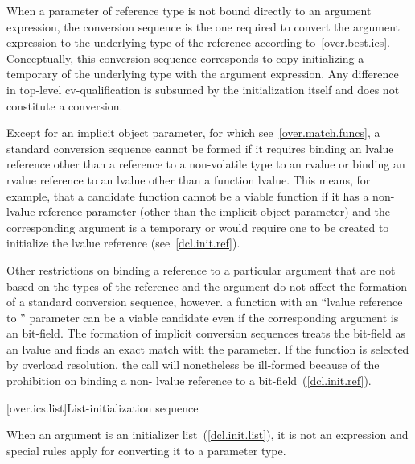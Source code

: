 \pnum
When a parameter of reference type is not bound directly to an argument
expression, the conversion sequence is the one required to convert the argument
expression to the underlying type of the reference according to~\ref{over.best.ics}.
Conceptually, this conversion sequence corresponds to copy-initializing a
temporary of the underlying type with the argument expression.
Any difference
in top-level cv-qualification is subsumed by the initialization itself and
does not constitute a conversion.

\pnum
Except for an implicit object parameter, for which see~\ref{over.match.funcs}, a
standard conversion sequence cannot be formed if it requires
binding an lvalue reference
other than a reference to a non-volatile  type
to an rvalue
or binding an rvalue reference to an lvalue other than a function lvalue.
\enternote
This means, for example, that a candidate function cannot be a viable
function if it has a non- lvalue reference parameter (other than
the implicit object parameter) and the corresponding argument is
a temporary or would require one to be created to initialize the lvalue
reference (see~\ref{dcl.init.ref}).
\exitnote

\pnum
Other restrictions on binding a reference to a particular argument
that are not based on the types of the reference and the argument
do not affect the formation of a standard conversion
sequence, however.
\enterexample
a function with an ``lvalue reference to '' parameter can
be a viable candidate even if the corresponding argument is an
bit-field.
The formation of implicit conversion sequences
treats the
bit-field as an
lvalue and finds an exact
match with the parameter.
If the function is selected by overload
resolution, the call will nonetheless be ill-formed because of
the prohibition on binding a non- lvalue reference to a bit-field~(\ref{dcl.init.ref}).
\exitexample

[over.ics.list]{List-initialization sequence}

\pnum
When an argument is an initializer list~(\ref{dcl.init.list}), it is not an
expression and special rules apply for converting it to a parameter type.

